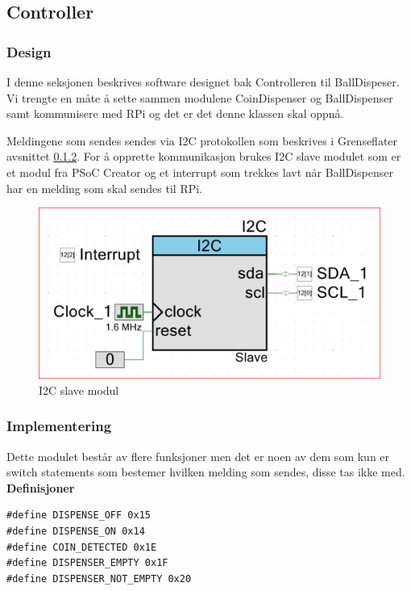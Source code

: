 \documentclass[Softwaredesign/Softwaredesign_main.tex]{subfiles}
\begin{document}
\subsection{Controller}
\subsubsection{Design}
I denne seksjonen beskrives software designet bak Controlleren til BallDispeser. Vi trengte en måte å sette sammen modulene CoinDispenser og BallDispenser samt kommunisere med RPi og det er det denne klassen skal oppnå. 




Meldingene som sendes sendes via I2C protokollen som beskrives i Grenseflater avsnittet \ref{}. For å opprette kommunikasjon brukes I2C slave modulet som er et modul fra PSoC Creator og et interrupt som trekkes lavt når BallDispenser har en melding som skal sendes til RPi.
\begin{figure}[H]
    \centering
    \includegraphics[width=\textwidth]{Rapport/BallDispenser/ballDispenserController/graphics/I2Cslave.png}
    \caption{I2C slave modul}
    \label{fig:I2CSlaveBallDisp}
\end{figure}
\subsubsection{Implementering}
Dette modulet består av flere funksjoner men det er noen av dem som kun er switch statements som bestemer hvilken melding som sendes, disse tas ikke med.\\
{\textbf{Definisjoner}}\\
\begin{lstlisting}[caption={Defininisjoner BallDispenser Controller},style=customc,label={lst:dispenserControlFunction}]
#define DISPENSE_OFF 0x15
#define DISPENSE_ON 0x14
#define COIN_DETECTED 0x1E
#define DISPENSER_EMPTY 0x1F
#define DISPENSER_NOT_EMPTY 0x20
\end{lstlisting}
\end{document}
